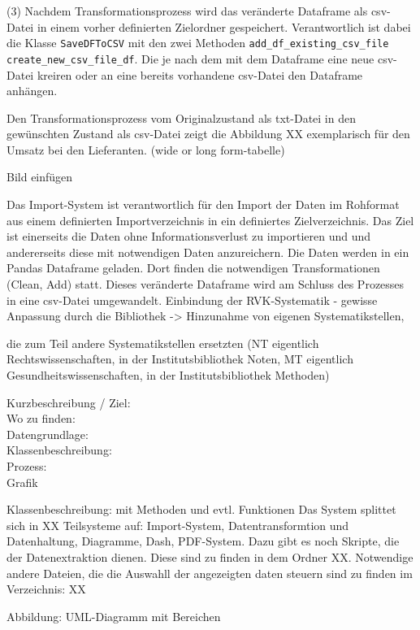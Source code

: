     
    (3) Nachdem Transformationsprozess wird das veränderte Dataframe als csv-Datei in einem vorher definierten Zielordner gespeichert. Verantwortlich ist dabei die Klasse    
    \texttt{SaveDFToCSV} mit den zwei Methoden \texttt{add\_df\_existing\_csv\_file create\_new\_csv\_file\_df}. 
    Die je nach dem mit dem Dataframe eine neue csv-Datei kreiren oder an eine bereits vorhandene csv-Datei den Dataframe anhängen.
    
    Den Transformationsprozess vom Originalzustand als txt-Datei in den gewünschten Zustand als csv-Datei zeigt die Abbildung XX exemplarisch für den Umsatz bei den
    Lieferanten. (wide or long form-tabelle)
    
    Bild einfügen
    
    
    Das Import-System ist verantwortlich für den Import der Daten im Rohformat aus einem definierten Importverzeichnis in ein definiertes Zielverzeichnis. Das Ziel
    ist einerseits die Daten ohne Informationsverlust zu importieren und und andererseits diese mit notwendigen Daten anzureichern. Die Daten werden in ein Pandas Dataframe
    geladen. Dort finden die notwendigen Transformationen (Clean, Add) statt. Dieses veränderte Dataframe wird am Schluss des Prozesses in eine csv-Datei umgewandelt.
    Einbindung der RVK-Systematik - gewisse Anpassung durch die Bibliothek -> Hinzunahme von eigenen Systematikstellen,
    
    die zum Teil andere Systematikstellen ersetzten (NT eigentlich Rechtswissenschaften, in der Institutsbibliothek Noten, MT eigentlich
    Gesundheitswissenschaften, in der Institutsbibliothek Methoden)
 
      
    Kurzbeschreibung / Ziel:\\
    Wo zu finden:\\
    Datengrundlage:\\
    Klassenbeschreibung:\\
    Prozess:\\
    
    Grafik
    
    Klassenbeschreibung: mit Methoden und evtl. Funktionen
    Das System splittet sich in XX Teilsysteme auf: Import-System, Datentransformtion und Datenhaltung, Diagramme, Dash, PDF-System. Dazu gibt es noch Skripte,
    die der Datenextraktion dienen. Diese sind zu finden in dem Ordner XX. Notwendige andere Dateien, die die Auswahll der angezeigten daten steuern sind zu finden im          
    Verzeichnis: XX
    
    Abbildung: UML-Diagramm mit Bereichen
    
